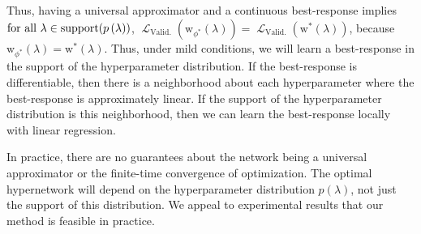 \documentclass{article} %
\newcommand{\prior}[1]{p \left( #1 \right)} %
\newcommand{\param}{\mathrm{w}} %
\newcommand{\hyper}{\lambda} %
\newcommand{\hyperDist}{\prior{\hyper}} %
\newcommand{\hyperHyper}{\hyper'} %
\newcommand{\innerOptParam}[1]{\param^{*} \! \left( #1 \right)} %
\newcommand{\lossSymbol}{\mathop{\mathcal{L}}} %
\newcommand{\lossSymbolOuter}{\lossSymbol_{\mathrm{Valid.}}} %
\newcommand{\outerLoss}[1]{\lossSymbolOuter \! \left( #1 \right)}%
\newcommand{\responseParam}{\phi} %
\newcommand{\approxResponseSymbol}[1]{\param_{#1}} %
\newcommand{\approxResponseOutput}[1]{\approxResponseSymbol{\responseParam^{*}} ( #1 )}
\newcommand{\proofTargetLossOutput}{\outerLoss{\approxResponseOutput{\hyper}}}
\newcommand{\targetLoss}{\outerLoss{\innerOptParam{\hyper}}}
\newcommand{\phyper}{p \left( \hyper \right)}
\newcommand{\hyperSupport}{\mathrm{support} \! \left( \phyper \right)} %
\newcommand{\hyperDomain}{\textnormal{for all } \hyper \in \hyperSupport}
\begin{document}
%
Thus, having a universal approximator and a continuous best-response implies $\hyperDomain$, $\proofTargetLossOutput = \targetLoss$, because $\approxResponseOutput{\hyper} = \innerOptParam{\hyper}$.
Thus, under mild conditions, we will learn a best-response in the support of the hyperparameter distribution.
If the best-response is differentiable, then there is a neighborhood about each hyperparameter where the best-response is approximately linear.
If the support of the hyperparameter distribution is this neighborhood, then we can learn the best-response locally with linear regression.

In practice, there are no guarantees about the network being a universal approximator or the finite-time convergence of optimization.
The optimal hypernetwork will depend on the hyperparameter distribution $p(\hyper)$, not just the support of this distribution.
We appeal to experimental results that our method is feasible in practice.
\end{document}
